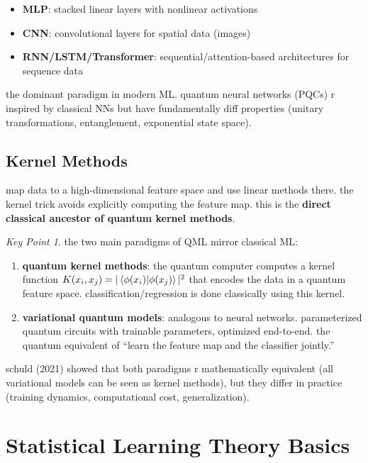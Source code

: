 \documentclass[11pt,a4paper]{article}
\theoremstyle{definition}
\theoremstyle{remark}
\newtheorem*{keypoint}{Key Point}
\begin{document}
\begin{itemize}
    \item \textbf{MLP}: stacked linear layers with nonlinear activations
    \item \textbf{CNN}: convolutional layers for spatial data (images)
    \item \textbf{RNN/LSTM/Transformer}: sequential/attention-based architectures for sequence data
\end{itemize}

the dominant paradigm in modern ML. quantum neural networks (PQCs) r inspired by classical NNs but have fundamentally diff properties (unitary transformations, entanglement, exponential state space).

\subsection{Kernel Methods}

map data to a high-dimensional feature space and use linear methods there. the kernel trick avoids explicitly computing the feature map. this is the \textbf{direct classical ancestor of quantum kernel methods}.

\begin{keypoint}
the two main paradigms of QML mirror classical ML:
\begin{enumerate}
    \item \textbf{quantum kernel methods}: the quantum computer computes a kernel function $K(x_i, x_j) = |\braket{\phi(x_i)|\phi(x_j)}|^2$ that encodes the data in a quantum feature space. classification/regression is done classically using this kernel.
    \item \textbf{variational quantum models}: analogous to neural networks. parameterized quantum circuits with trainable parameters, optimized end-to-end. the quantum equivalent of ``learn the feature map and the classifier jointly.''
\end{enumerate}
schuld (2021) showed that both paradigms r mathematically equivalent (all variational models can be seen as kernel methods), but they differ in practice (training dynamics, computational cost, generalization).
\end{keypoint}

\section{Statistical Learning Theory Basics}
\end{document}

